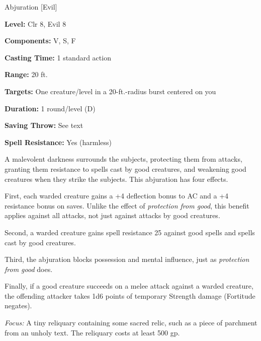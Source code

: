 
Abjuration [Evil]

\textbf{Level:} Clr 8, Evil 8

\textbf{Components:} V, S, F

\textbf{Casting Time:} 1 standard action

\textbf{Range:} 20 ft.

\textbf{Targets:} One creature/level in a 20-ft.-radius burst centered on you

\textbf{Duration:} 1 round/level (D)

\textbf{Saving Throw:} See text

\textbf{Spell Resistance:} Yes (harmless)

A malevolent darkness surrounds the subjects, protecting them from attacks, granting 
them resistance to spells cast by good creatures, and weakening good creatures 
when they strike the subjects. This abjuration has four effects.

First, each warded creature gains a +4 deflection bonus to AC and a +4 resistance 
bonus on saves. Unlike the effect of \textit{protection from good}, this benefit 
applies against all attacks, not just against attacks by good creatures.

Second, a warded creature gains spell resistance 25 against good spells and spells 
cast by good creatures.

Third, the abjuration blocks possession and mental influence, just as \textit{protection 
from good} does.

Finally, if a good creature succeeds on a melee attack against a warded creature, 
the offending attacker takes 1d6 points of temporary Strength damage (Fortitude 
negates).

\textit{Focus:} A tiny reliquary containing some sacred relic, such as a piece 
of parchment from an unholy text. The reliquary costs at least 500 gp.

